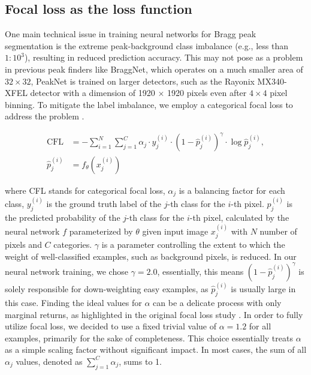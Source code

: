 \documentclass[a4paper]{article}
\newcommand{\peaknet}{PeakNet}
\begin{document}
\subsection{Focal loss as the loss function}

One main technical issue in training neural networks for Bragg peak segmentation is the extreme peak-background class imbalance (e.g., less than $1 : 10^3$), resulting in reduced prediction accuracy.  This may not pose as a problem in previous peak finders like BraggNet, which operates on a much smaller area of $32 \times 32$, \peaknet{} is trained on larger detectors, such as the Rayonix MX340-XFEL detector with a dimension of 1920 $\times$ 1920 pixels even after $4 \times 4$ pixel binning.  To mitigate the label imbalance, we employ a categorical focal loss to address the problem \citep{linFocalLossDense2018}.

\begin{align}
\text{CFL} &= - \sum_{i = 1}^{N}\sum_{j = 1}^{C} 
            \alpha_j \cdot y_j^{(i)} \cdot (1-\hat{p}_j^{(i)})^\gamma 
            \cdot \log{\hat{p}_j^{(i)}}, \\
\hat{p}_j^{(i)} &= f_\theta(x_j^{(i)})
\end{align}

where CFL stands for categorical focal loss, $\alpha_j$ is a balancing factor for each class, $y_j^{(i)}$ is the ground truth label of the $j$-th class for the $i$-th pixel.  $p_j^{(i)}$ is the predicted probability of the $j$-th class for the $i$-th pixel, calculated by the neural network $f$ parameterized by $\theta$ given input image $x_j^{(i)}$ with $N$ number of pixels and $C$ categories.  $\gamma$ is a parameter controlling the extent to which the weight of well-classified examples, such as background pixels, is reduced.  In our neural network training, we chose $\gamma = 2.0$, essentially, this means $(1-\hat{p}_j^{(i)}) ^\gamma$ is solely responsible for down-weighting easy examples, as $\hat{p}_j^{(i)}$ is usually large in this case.  Finding the ideal values for $\alpha$ can be a delicate process with only marginal returns, as highlighted in the original focal loss study \citep{linFocalLossDense2018}.  In order to fully utilize focal loss, we decided to use a fixed trivial value of $\alpha = 1.2$ for all examples, primarily for the sake of completeness.  This choice essentially treats $\alpha$ as a simple scaling factor without significant impact.  In most cases, the sum of all $\alpha_j$ values, denoted as $\sum_{j = 1}^{C} \alpha_j$, sums to 1.
\end{document}
